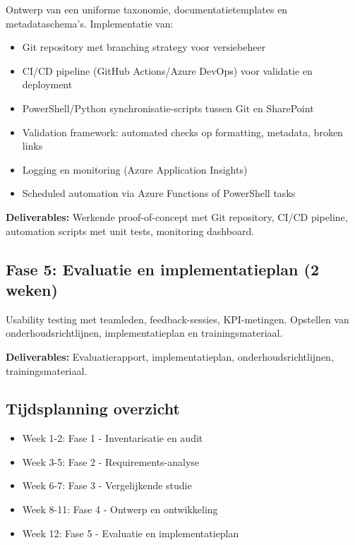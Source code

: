 Ontwerp van een uniforme taxonomie, documentatie\-templates en meta\-data\-schema's. Implementatie van:

\begin{itemize}
  \item Git repository met branching strategy voor versiebeheer
  \item CI/CD pipeline (GitHub Actions/\allowbreak Azure DevOps) voor validatie en deployment
  \item Power\-Shell/\allowbreak Python synchronisatie-scripts tussen Git en Share\-Point
  \item Validation framework: automated checks op formatting, metadata, broken links
  \item Logging en monitoring (Azure Application Insights)
  \item Scheduled automation via Azure Functions of Power\-Shell tasks
\end{itemize}

\textbf{Deliverables:} Werkende proof-of-concept met Git repository, CI/CD pipeline, automation scripts met unit tests, monitoring dashboard.

\subsection{Fase 5: Evaluatie en implementatieplan (2 weken)}

Usability testing met teamleden, feedback-sessies, KPI-metingen. Opstellen van onderhouds\-richtlijnen, implementatieplan en trainings\-materiaal.

\textbf{Deliverables:} Evaluatierapport, implementatie\-plan, onderhouds\-richtlijnen, trainings\-materiaal.

\subsection{Tijdsplanning overzicht}

\begin{itemize}
  \item Week 1-2: Fase 1 - Inventarisatie en audit
  \item Week 3-5: Fase 2 - Requirements-analyse
  \item Week 6-7: Fase 3 - Vergelijkende studie
  \item Week 8-11: Fase 4 - Ontwerp en ontwikkeling
  \item Week 12: Fase 5 - Evaluatie en implementatieplan
\end{itemize}

